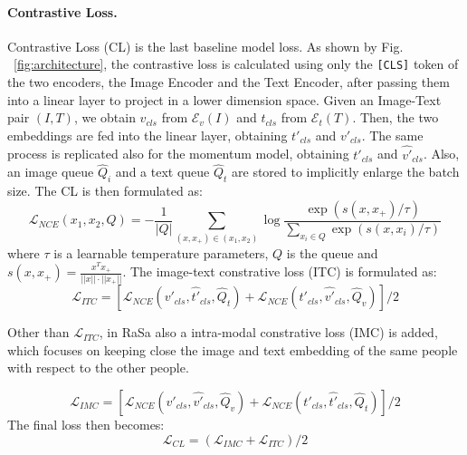 \documentclass[acmsmall]{acmart}
\newcommand{\anote}[1]{\textcolor{red}{AP: #1}}
\begin{document}
\paragraph{Contrastive Loss.}
Contrastive Loss (CL) is the last baseline model loss. As shown by Fig. ~\ref{fig:architecture}, the contrastive loss is calculated using only the \texttt{[CLS]} token of the two encoders, the Image Encoder and the Text Encoder, after passing them into a linear layer to project in a lower dimension space. Given an Image-Text pair $(I,T)$, we obtain $v_{cls}$  from $\mathcal{E}_v(I)$ and $t_{cls}$ from $\mathcal{E}_t(T)$. Then, the two embeddings are fed into the linear layer, obtaining $t'_{cls}$ and $v'_{cls}$. The same process is replicated also for the momentum model, obtaining  $\hat{t'}_{cls}$ and $\hat{v'}_{cls}$. Also, an image queue $\hat{Q}_i$ and a text queue $\hat{Q}_t$ are stored to implicitly enlarge the batch size. The CL is then formulated as:
\begin{equation}
    \mathcal{L}_{NCE}(x_1,x_2,Q)=-\frac{1}{|Q|}\sum_{(x,x_+)\in (x_1,x_2)}\log \frac{\exp(s(x,x_+)/\tau)}{\sum_{x_i\in Q}\exp(s(x,x_i)/\tau)}
\end{equation}
where $\tau$ is a learnable temperature parameters, $Q$ is the queue and $s(x,x_+)=\frac{x^Tx_+}{||x||\cdot||x_+||}$. The image-text constrative loss (ITC) \cite{li2021align,radford2021learning} is formulated as:
\begin{equation}
    \mathcal{L}_{ITC}=[\mathcal{L}_{NCE}(v'_{cls},\hat{t'}_{cls},\hat{Q}_t)+\mathcal{L}_{NCE}(t'_{cls},\hat{v'}_{cls},\hat{Q}_v)]/2
\end{equation}

\noindent
Other than $\mathcal{L}_{ITC}$, in RaSa also a intra-modal constrative loss (IMC) is added, which focuses on keeping close the image and text embedding of the same people with respect to the other people.

\begin{equation}
    \mathcal{L}_{IMC}=[\mathcal{L}_{NCE}(v'_{cls},\hat{v'}_{cls},\hat{Q}_v)+\mathcal{L}_{NCE}(t'_{cls},\hat{t'}_{cls},\hat{Q}_t)]/2
\end{equation}
\noindent
The final loss then becomes:
\begin{equation}
    \mathcal{L}_{CL}=(\mathcal{L}_{IMC}+\mathcal{L}_{ITC})/2
\end{equation}
\end{document}
